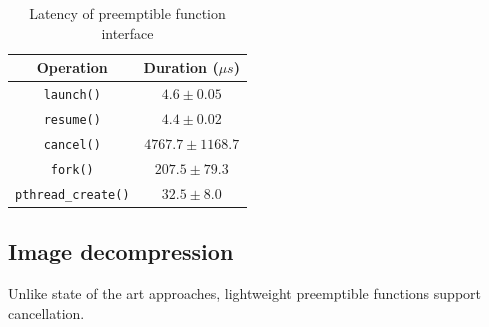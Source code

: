 \begin{table}
\begin{center}
\begin{tabular}{c | c}
Operation & Duration ($\mu{s}$) \\
\hline
\texttt{launch()} & $4.6 \pm 0.05$ \\
\texttt{resume()} & $4.4 \pm 0.02$ \\
\texttt{cancel()} & $4767.7 \pm 1168.7$ \\
\hline
\texttt{fork()} & $207.5 \pm 79.3$ \\
\texttt{pthread\_create()} & $32.5 \pm 8.0$
\end{tabular}
\end{center}
\caption{Latency of preemptible function interface}
\label{tab:libinger}
\end{table}


\subsection{Image decompression}
\label{sec:libinger:bombs}

Unlike state of the art approaches, lightweight preemptible functions support
cancellation.
\begin{sloppypar}

\end{sloppypar}
